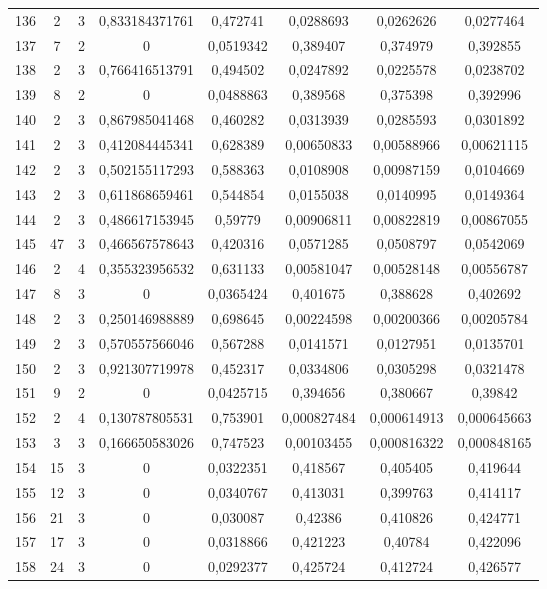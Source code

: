 \begin{longtable}{|c|c|c|c|c|c|c|c|}
136 & 2 & 3 & 0,833184371761 & 0,472741 & 0,0288693 & 0,0262626 & 0,0277464  \\
137 & 7 & 2 & 0 & 0,0519342 & 0,389407 & 0,374979 & 0,392855  \\
138 & 2 & 3 & 0,766416513791 & 0,494502 & 0,0247892 & 0,0225578 & 0,0238702  \\
139 & 8 & 2 & 0 & 0,0488863 & 0,389568 & 0,375398 & 0,392996  \\
140 & 2 & 3 & 0,867985041468 & 0,460282 & 0,0313939 & 0,0285593 & 0,0301892  \\
141 & 2 & 3 & 0,412084445341 & 0,628389 & 0,00650833 & 0,00588966 & 0,00621115  \\
142 & 2 & 3 & 0,502155117293 & 0,588363 & 0,0108908 & 0,00987159 & 0,0104669  \\
143 & 2 & 3 & 0,611868659461 & 0,544854 & 0,0155038 & 0,0140995 & 0,0149364  \\
144 & 2 & 3 & 0,486617153945 & 0,59779 & 0,00906811 & 0,00822819 & 0,00867055  \\
145 & 47 & 3 & 0,466567578643 & 0,420316 & 0,0571285 & 0,0508797 & 0,0542069  \\
146 & 2 & 4 & 0,355323956532 & 0,631133 & 0,00581047 & 0,00528148 & 0,00556787  \\
147 & 8 & 3 & 0 & 0,0365424 & 0,401675 & 0,388628 & 0,402692  \\
148 & 2 & 3 & 0,250146988889 & 0,698645 & 0,00224598 & 0,00200366 & 0,00205784  \\
149 & 2 & 3 & 0,570557566046 & 0,567288 & 0,0141571 & 0,0127951 & 0,0135701  \\
150 & 2 & 3 & 0,921307719978 & 0,452317 & 0,0334806 & 0,0305298 & 0,0321478  \\
151 & 9 & 2 & 0 & 0,0425715 & 0,394656 & 0,380667 & 0,39842  \\
152 & 2 & 4 & 0,130787805531 & 0,753901 & 0,000827484 & 0,000614913 & 0,000645663  \\
153 & 3 & 3 & 0,166650583026 & 0,747523 & 0,00103455 & 0,000816322 & 0,000848165  \\
154 & 15 & 3 & 0 & 0,0322351 & 0,418567 & 0,405405 & 0,419644  \\
155 & 12 & 3 & 0 & 0,0340767 & 0,413031 & 0,399763 & 0,414117  \\
156 & 21 & 3 & 0 & 0,030087 & 0,42386 & 0,410826 & 0,424771  \\
157 & 17 & 3 & 0 & 0,0318866 & 0,421223 & 0,40784 & 0,422096  \\
158 & 24 & 3 & 0 & 0,0292377 & 0,425724 & 0,412724 & 0,426577  \\

\end{longtable}
